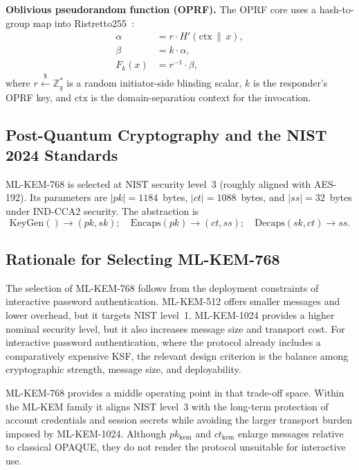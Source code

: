 \documentclass[preprint,12pt]{elsarticle}
\theoremstyle{remark}
\begin{document}
\textbf{Oblivious pseudorandom function (OPRF).} The OPRF core uses a
hash-to-group map into Ristretto255~\cite{devalence2024}:
\begin{equation}
  \label{eq:oprf-core}
  \begin{aligned}
    \alpha &= r \cdot H'(\mathrm{ctx} \,\|\, x),\\
    \beta &= k \cdot \alpha,\\
    F_k(x) &= r^{-1} \cdot \beta,
  \end{aligned}
\end{equation}
where $r \xleftarrow{\$} \mathbb{Z}_q^*$ is a random initiator-side
blinding scalar, $k$ is the responder's OPRF key, and $\mathrm{ctx}$ is
the domain-separation context for the invocation.

\subsection{Post-Quantum Cryptography and the NIST 2024 Standards}

ML-KEM-768 is selected at NIST security level~3 (roughly aligned with
AES-192). Its parameters are $|pk| = 1184$~bytes,
$|ct| = 1088$~bytes, and $|ss| = 32$~bytes under IND-CCA2 security.
The abstraction is
\begin{equation}
  \mathrm{KeyGen}() \to (pk, sk);\quad
  \mathrm{Encaps}(pk) \to (ct, ss);\quad
  \mathrm{Decaps}(sk, ct) \to ss.
\end{equation}

\subsection{Rationale for Selecting ML-KEM-768}

The selection of ML-KEM-768 follows from the deployment constraints of
interactive password authentication. ML-KEM-512 offers smaller messages
and lower overhead, but it targets NIST level~1. ML-KEM-1024 provides a
higher nominal security level, but it also increases message size and
transport cost. For interactive password authentication, where the
protocol already includes a comparatively expensive KSF, the relevant
design criterion is the balance among cryptographic strength, message
size, and deployability.

ML-KEM-768 provides a middle operating point in that trade-off space.
Within the ML-KEM family it aligns NIST level~3 with the long-term
protection of account credentials and session secrets while avoiding
the larger transport burden imposed by ML-KEM-1024. Although
$pk_{\mathrm{kem}}$ and $ct_{\mathrm{kem}}$ enlarge
messages relative to classical OPAQUE, they do not render the protocol
unsuitable for interactive use.
\end{document}
